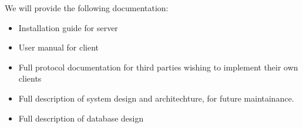 We will provide the following documentation:
\begin{itemize}
\item Installation guide for server
\item User manual for client
\item Full protocol documentation for third parties wishing to implement their
      own clients
\item Full description of system design and architechture, for future
      maintainance.
\item Full description of database design
\end{itemize}
